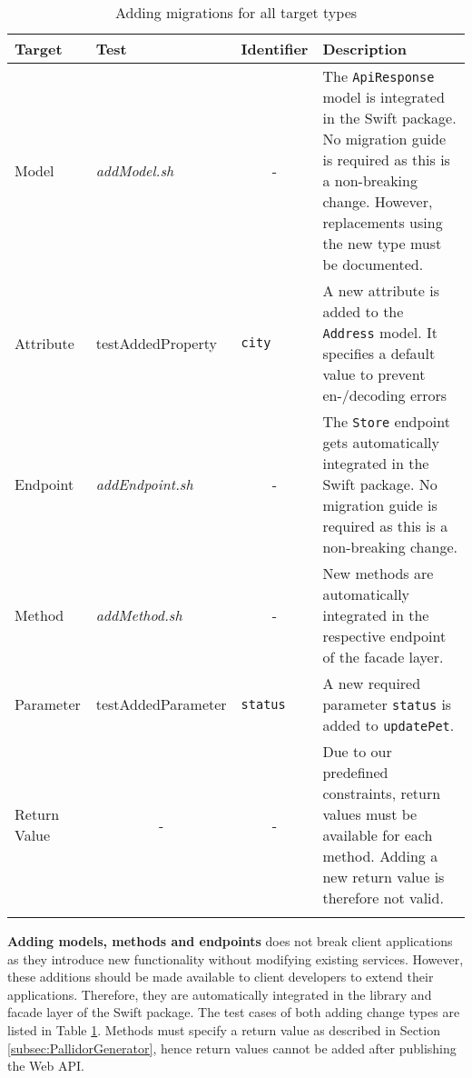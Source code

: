 	\begin{center}
	\begin{longtable}{@{}lp{}p{}p{}@{}}
		\toprule
		\textbf{Target} & \textbf{Test} & \textbf{Identifier} & \textbf{Description} \\ \midrule \endhead
		Model           &   \textit{addModel.sh} &    \multicolumn{1}{c}{-}      &   The \texttt{ApiResponse} model is integrated in the Swift package. No migration guide is required as this is a non-breaking change. However, replacements using the new type must be documented.  \\
		Attribute       &   test\-Added\-Property   &    \texttt{city}      &      A new attribute is added to the \texttt{Address} model. It specifies a default value to prevent en-/decoding errors       \\
		Endpoint        &          \textit{addEndpoint.sh} &    \multicolumn{1}{c}{-}      &            The \texttt{Store} endpoint gets automatically integrated in the Swift package. No migration guide is required as this is a non-breaking change.                               \\
		Method        &         \textit{addMethod.sh}  &    \multicolumn{1}{c}{-}      &            New methods are automatically integrated in the respective endpoint of the facade layer.                      \\
		Parameter       &               test\-Added\-Parameter                    &    \texttt{status}                        &       A new required parameter \texttt{status} is added to \texttt{updatePet}.             \\
		Return Value    &            \multicolumn{1}{c}{-}  &    \multicolumn{1}{c}{-}                   &      Due to our predefined constraints, return values must be available for each method. Adding a new return value is therefore not valid.         \\ \bottomrule
			\caption{Adding migrations for all target types}
		\label{tab:AddMigrationTests}
	\end{longtable}
\end{center}
\vspace{-1cm}

 \textbf{Adding models, methods and endpoints} does not break client applications as they introduce new functionality without modifying existing services. However, these additions should be made available to client developers to extend their applications. Therefore, they are automatically integrated in the library and facade layer of the Swift package. The test cases of both adding change types are listed in Table \ref{tab:AddMigrationTests}. Methods must specify a return value as described in Section \ref{subsec:PallidorGenerator}, hence return values cannot be added after publishing the Web API.

